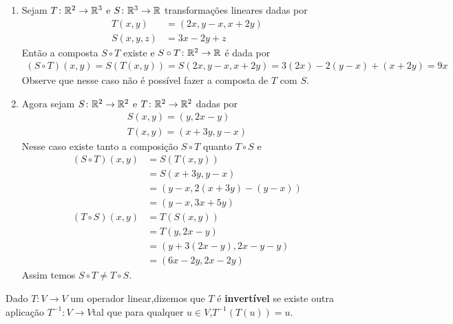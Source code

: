 \begin{exemplos}
    \begin{enumerate}
        \item Sejam $T \colon \mathbb{R}^2 \to \mathbb{R}^3$ e $S \colon \mathbb{R}^3 \to \mathbb{R}$ transformações lineares dadas por
        \begin{align*}
            T(x, y) &= (2x, y - x, x + 2y)\\
            S(x, y, z) &= 3x - 2y + z
        \end{align*}
        Então a composta $S \circ T$ existe e $S \circ T \colon \mathbb{R}^2 \to \mathbb{R}$ é dada por
        \begin{align*}
            (S \circ T)(x, y) = S(T(x, y)) = S(2x, y - x, x + 2y) = 3(2x) - 2(y - x) + (x + 2y) = 9x
        \end{align*}
        Observe que nesse caso não é possível fazer a composta de $T$ com $S$.

        \item Agora sejam $S \colon \mathbb{R}^2 \to \mathbb{R}^2$ e $T \colon \mathbb{R}^2 \to \mathbb{R}^2$ dadas por
        \begin{align*}
            S(x, y) = (y, 2x - y)\\
            T(x, y) = (x + 3y, y - x)
        \end{align*}
        Nesse caso existe tanto a composição $S \circ T$ quanto $T \circ S$ e
        \begin{align*}
            (S \circ T)(x, y) &= S(T(x, y)) \\ &= S(x + 3y, y - x) \\ &= (y - x, 2(x + 3y) - (y - x)) \\ &= (y - x, 3x + 5y)\\
            (T \circ S)(x, y) &= T(S(x, y)) \\ &= T(y, 2x - y) \\ &= (y + 3(2x - y), 2x - y - y) \\ &= (6x - 2y, 2x - 2y)
        \end{align*}
        Assim temos $S \circ T \ne T \circ S$.
    \end{enumerate}
\end{exemplos}

\begin{definicao}
    Dado $T \colon V \to V$ um operador linear,dizemos que $T$ é \textbf{invertível} se existe outra aplicação $T^{-1} \colon V \to V$tal que para qualquer $u \in V$,$T^{-1}(T(u)) = u$.
\end{definicao}

